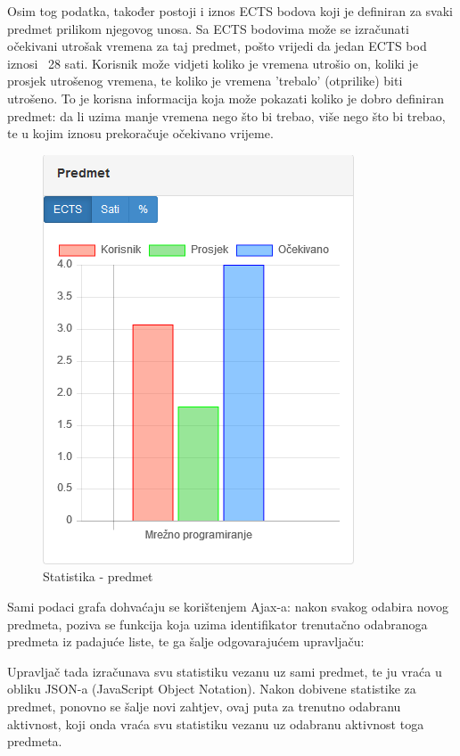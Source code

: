 \documentclass[times, utf8, zavrsni]{fer}
\begin{document}
Osim tog podatka, također postoji i iznos ECTS bodova koji je definiran za svaki predmet prilikom njegovog unosa. Sa ECTS bodovima može se izračunati očekivani utrošak vremena za taj predmet, pošto vrijedi da jedan ECTS bod iznosi ~28 sati. Korisnik može vidjeti koliko je vremena utrošio on, koliki je prosjek utrošenog vremena, te koliko je vremena 'trebalo' (otprilike) biti utrošeno. To je korisna informacija koja može pokazati koliko je dobro definiran predmet: da li uzima manje vremena nego što bi trebao, više nego što bi trebao, te u kojim iznosu prekoračuje očekivano vrijeme.

\begin{figure}[H]
\centering
\includegraphics{img/statistika-predmet.png}
\caption{Statistika - predmet}
\label{fig:statistika-predmet}
\end{figure}

Sami podaci grafa dohvaćaju se korištenjem Ajax-a: nakon svakog odabira novog predmeta, poziva se funkcija koja uzima identifikator trenutačno odabranoga predmeta iz padajuće liste, te ga šalje odgovarajućem upravljaču:

\lstset{style=js}


Upravljač tada izračunava svu statistiku vezanu uz sami predmet, te ju vraća u obliku JSON-a (JavaScript Object Notation). Nakon dobivene statistike za predmet, ponovno se šalje novi zahtjev, ovaj puta za trenutno odabranu aktivnost, koji onda vraća svu statistiku vezanu uz odabranu aktivnost toga predmeta.
\clearpage
\end{document}
